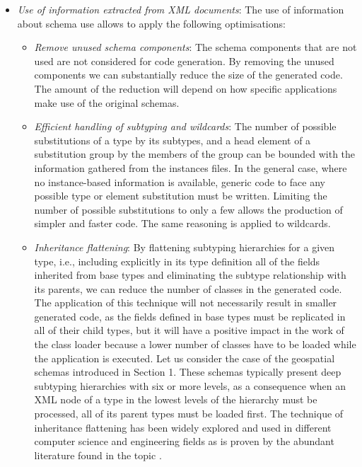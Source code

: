 \documentclass{sig-alternate}
\begin{document}
\begin{sloppypar}
\begin{itemize}
\item \textit{Use of information extracted from XML documents}: The use of  information about schema use allows to apply the following optimisations:  			 
\begin{itemize}
			\item \textit{Remove unused schema components}: The schema components that are not used are not considered for code generation. By removing the unused components we can substantially reduce the size of the generated code. The amount of the reduction will depend on how specific applications make use of the original schemas. 
			\item \textit{Efficient handling of subtyping and wildcards}: The number of possible substitutions of a type by its subtypes, and a head element of a substitution group by the members of the group can be bounded with the information gathered from the instances files. In the general case, where no instance-based information is available, generic code to face any possible type or element substitution must be written. Limiting the number of possible substitutions to only a few allows the production of simpler and faster code. The same reasoning is applied to wildcards.
			\item \textit{Inheritance flattening}: By flattening subtyping hierarchies for a given type, i.e., including explicitly in its type definition all of the fields inherited from base types and eliminating the subtype relationship with its parents, we can reduce the number of classes in the generated code.  The application of this technique  will not necessarily result in smaller generated code, as the fields defined in base types must be replicated in all of their child types, but it will have a positive impact in the work of the class loader because a lower number of classes have to be loaded while the application is executed. Let us consider the case of the geospatial schemas introduced in Section 1. These schemas typically present deep subtyping hierarchies with six or more levels, as a consequence when an XML node of a type in the lowest levels of the hierarchy must be processed, all of its parent types must be loaded first. The technique of inheritance flattening has been widely explored and used in different computer science and engineering fields as is proven by the abundant literature found in the topic \cite{proc:beyer, proc:ciprian, proc:bungartz,  article:bungartz, proc:ciccheti, proc:lagorio}.

\end{itemize}
\end{itemize}
\end{sloppypar}
\end{document}
